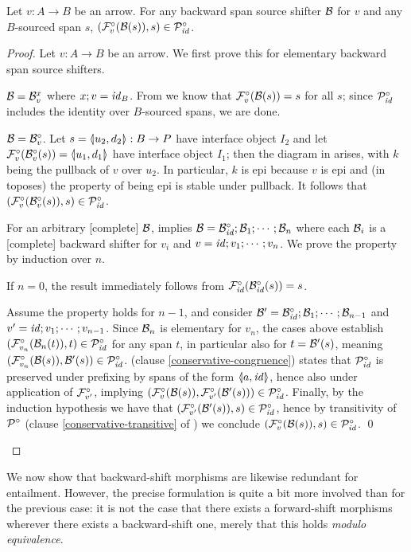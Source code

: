 \begin{lemma}
Let $v:A\to B$ be an arrow. For any backward span source shifter $\cB$ for $v$ and any $B$-sourced span $s$, $(\dF v(\cB(s)),s)\in \ccP_\id$.
\end{lemma}
%
\begin{proof}
Let $v:A\to B$ be an arrow. We first prove this for elementary backward span source shifters.
\begin{itemizeS}
\item $\cB=\rB v x$ where $x;v=\id_B$. From  we know that $\dF v(\cB(s))=s$ for all $s$; since $\ccP_\id$ includes the identity over $B$-sourced spans, we are done.

\item $\cB=\dB v$. Let $s=\spanof{u_2}{d_2}:B\to P$ have interface object $I_2$ and let $\dF v(\dB v(s))=\spanof{u_1}{d_1}$ have interface object $I_1$; then the diagram in  arises, with $k$ being the pullback of $v$ over $u_2$. In particular, $k$ is epi because $v$ is epi and (in toposes) the property of being epi is stable under pullback. It follows that $(\dF v(\dB v(s)),s)\in \ccP_\id$.
\end{itemizeS}
%
For an arbitrary [complete] $\cB$,  implies $\cB=\dB\id;\cB_1;\cdots;\cB_n$ where each $\cB_i$ is a [complete] backward shifter for $v_i$ and $v=\id;v_1;\cdots;v_n$. We prove the property by induction over $n$.
\begin{itemizeS}
\item If $n=0$, the result immediately follows from $\dF\id(\dB\id(s))=s$.
\item Assume the property holds for $n-1$, and consider $\cB'=\dB\id; \cB_1;\cdots;\cB_{n-1}$ and $v'=\id;v_1;\cdots;v_{n-1}$. Since $\cB_n$ is elementary for $v_n$, the cases above establish $(\dF{v_n}(\cB_n(t)),t)\in \ccP_\id$ for any span $t$, in particular also for $t=\cB'(s)$, meaning $(\dF{v_n}(\cB(s)),\cB'(s))\in \ccP_\id$.  (clause \ref{conservative-congruence}) states that $\ccP_\id$ is preserved under prefixing by spans of the form $\spanof a \id$, hence also under application of $\dF{v'}$, implying $(\dF{v}(\cB(s)),\dF{v'}(\cB'(s)))\in \ccP_\id$. Finally, by the induction hypothesis we have that $(\dF{v'}(\cB'(s)),s)\in \ccP_\id$, hence by transitivity of $\ccP$ (clause \ref{conservative-transitive} of ) we conclude $(\dF{v}(\cB(s)),s)\in \ccP_\id$.
\qed
\end{itemizeS}
\end{proof}
%
We now show that backward-shift morphisms are likewise redundant for {\fprovable} entailment. However, the precise formulation is quite a bit more involved than for the previous case: it is not the case that there exists a forward-shift morphisms wherever there exists a backward-shift one, merely that this holds \emph{modulo {\fprovable} equivalence}.

